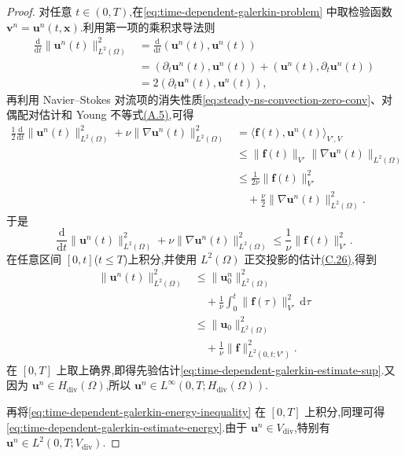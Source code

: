 \begin{lemma}[有限维问题的唯一可解性]
\begin{proof}
对任意 $t\in(0,T)$,在\cref{eq:time-dependent-galerkin-problem} 中取检验函数 $\bm{v}^n=\bm{u}^n(t,\bm{x})$.利用第一项的乘积求导法则
\begin{equation}\label{eq:time-dependent-galerkin-product-rule}
\begin{aligned}
  \frac{\mathrm{d}}{\mathrm{d}t}
    \lVert\bm{u}^n(t)\rVert_{L^2(\Omega)}^2
  &=\frac{\mathrm{d}}{\mathrm{d}t}
      (\bm{u}^n(t),\bm{u}^n(t))\\
  &=(\partial_t\bm{u}^n(t),\bm{u}^n(t))
      +(\bm{u}^n(t),\partial_t\bm{u}^n(t))\\
  &=2(\partial_t\bm{u}^n(t),\bm{u}^n(t)),
\end{aligned}
\end{equation}
再利用 Navier--Stokes 对流项的消失性质\cref{eq:steady-ns-convection-zero-conv}、对偶配对估计和 Young 不等式\hyperref[eq:appendix-a-5]{(A.5)},可得
\begin{equation}\label{eq:time-dependent-galerkin-energy-step}
\begin{aligned}
  \frac{1}{2}\frac{\mathrm{d}}{\mathrm{d}t}
      \lVert\bm{u}^n(t)\rVert_{L^2(\Omega)}^2
    +\nu\lVert\nabla\bm{u}^n(t)\rVert_{L^2(\Omega)}^2
  &=\langle\bm{f}(t),\bm{u}^n(t)\rangle_{V',V}\\
  &\leq \lVert\bm{f}(t)\rVert_{V'}
      \lVert\nabla\bm{u}^n(t)\rVert_{L^2(\Omega)}\\
  &\leq \frac{1}{2\nu}\lVert\bm{f}(t)\rVert_{V'}^2\\
  &\quad +\frac{\nu}{2}\lVert\nabla\bm{u}^n(t)\rVert_{L^2(\Omega)}^2.
\end{aligned}
\end{equation}
于是
\begin{equation}\label{eq:time-dependent-galerkin-energy-inequality}
  \frac{\mathrm{d}}{\mathrm{d}t}
      \lVert\bm{u}^n(t)\rVert_{L^2(\Omega)}^2
    +\nu\lVert\nabla\bm{u}^n(t)\rVert_{L^2(\Omega)}^2
    \leq\frac{1}{\nu}\lVert\bm{f}(t)\rVert_{V'}^2.
\end{equation}
在任意区间 $[0,t]$($t\leq T$)上积分,并使用 $L^2(\Omega)$ 正交投影的估计\hyperref[eq:appendix-c-26]{(C.26)},得到
\[
  \begin{aligned}
  \lVert\bm{u}^n(t)\rVert_{L^2(\Omega)}^2
    &\leq \lVert\bm{u}_0^n\rVert_{L^2(\Omega)}^2\\
    &\quad+\frac{1}{\nu}
       \int_0^t\lVert\bm{f}(\tau)\rVert_{V'}^2\,\mathrm{d}\tau\\
    &\leq \lVert\bm{u}_0\rVert_{L^2(\Omega)}^2\\
    &\quad+\frac{1}{\nu}\lVert\bm{f}\rVert_{L^2(0,t;V')}^2.
  \end{aligned}
\]
在 $[0,T]$ 上取上确界,即得先验估计\cref{eq:time-dependent-galerkin-estimate-sup}.又因为 $\bm{u}^n\in H_{\mathrm{div}}(\Omega)$,所以 $\bm{u}^n\in L^\infty(0,T;H_{\mathrm{div}}(\Omega))$.

再将\cref{eq:time-dependent-galerkin-energy-inequality} 在 $[0,T]$ 上积分,同理可得\cref{eq:time-dependent-galerkin-estimate-energy}.由于 $\bm{u}^n\in V_{\mathrm{div}}$,特别有 $\bm{u}^n\in L^2(0,T;V_{\mathrm{div}})$.
\end{proof}


\end{lemma}



